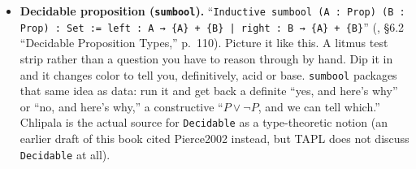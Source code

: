 \begin{itemize}
\tightlist
\item
  \textbf{Decidable proposition (\texttt{sumbool}).} ``\texttt{Inductive sumbool (A : Prop) (B : Prop) : Set := left : A → \{A\} + \{B\} | right : B → \{A\} + \{B\}}'' (\cite{Chlipala2013}, §6.2 ``Decidable Proposition Types,'' p.~110). Picture it like this. A litmus test strip rather than a question you have to reason through by hand. Dip it in and it changes color to tell you, definitively, acid or base. \texttt{sumbool} packages that same idea as data: run it and get back a definite ``yes, and here's why'' or ``no, and here's why,'' a constructive ``\(P \vee \neg P\), and we can tell which.'' Chlipala is the actual source for \texttt{Decidable} as a type-theoretic notion (an earlier draft of this book cited Pierce2002 instead, but TAPL does not discuss \texttt{Decidable} at all).
\end{itemize}
